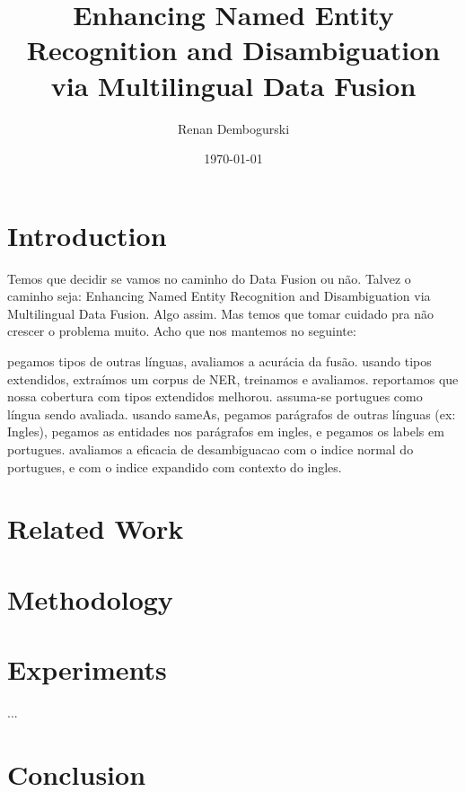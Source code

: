 \documentclass[10pt,a4paper]{llncs}
\title{Enhancing Named Entity Recognition and Disambiguation via Multilingual Data Fusion}
\author{Renan Dembogurski}
\date{\today}
\begin{document}
\maketitle

\begin{abstract}
\end{abstract}

\section{Introduction}

Temos que decidir se vamos no caminho do Data Fusion ou não. Talvez o caminho seja: Enhancing Named Entity Recognition and Disambiguation via Multilingual Data Fusion. Algo assim. Mas temos que tomar cuidado pra não crescer o problema muito. Acho que nos mantemos no seguinte:

pegamos tipos de outras línguas, avaliamos a acurácia da fusão.
usando tipos extendidos, extraímos um corpus de NER, treinamos e avaliamos.
reportamos que nossa cobertura com tipos extendidos melhorou.
assuma-se portugues como língua sendo avaliada. usando sameAs, pegamos parágrafos de outras línguas (ex: Ingles), pegamos as entidades nos parágrafos em ingles, e pegamos os labels em portugues.
avaliamos a eficacia de desambiguacao com o indice normal do portugues, e com o indice expandido com contexto do ingles.


\section{Related Work}


\section{Methodology}

\section{Experiments}

...


\section{Conclusion}




\end{document}
